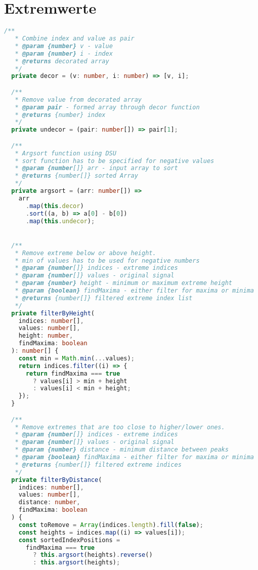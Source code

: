 \section{Extremwerte}\label{appendix:trend-detection-code:peaks}
\begin{lstlisting}[language=Typescript]
  /**
   * Combine index and value as pair
   * @param {number} v - value
   * @param {number} i - index
   * @returns decorated array
   */
  private decor = (v: number, i: number) => [v, i];

  /**
   * Remove value from decorated array
   * @param pair - formed array through decor function
   * @returns {number} index
   */
  private undecor = (pair: number[]) => pair[1];

  /**
   * Argsort function using DSU
   * sort function has to be specified for negative values
   * @param {number[]} arr - input array to sort
   * @returns {number[]} sorted Array
   */
  private argsort = (arr: number[]) =>
    arr
      .map(this.decor)
      .sort((a, b) => a[0] - b[0])
      .map(this.undecor);


  /**
   * Remove extreme below or above height.
   * min of values has to be used for negative numbers
   * @param {number[]} indices - extreme indices
   * @param {number[]} values - original signal
   * @param {number} height - minimum or maximum extreme height
   * @param {boolean} findMaxima - either filter for maxima or minima
   * @returns {number[]} filtered extreme index list
   */
  private filterByHeight(
    indices: number[],
    values: number[],
    height: number,
    findMaxima: boolean
  ): number[] {
    const min = Math.min(...values);
    return indices.filter((i) => {
      return findMaxima === true
        ? values[i] > min + height
        : values[i] < min + height;
    });
  }

  /**
   * Remove extremes that are too close to higher/lower ones.
   * @param {number[]} indices - extreme indices
   * @param {number[]} values - original signal
   * @param {number} distance - minimum distance between peaks
   * @param {boolean} findMaxima - either filter for maxima or minima
   * @returns {number[]} filtered extreme indices
   */
  private filterByDistance(
    indices: number[],
    values: number[],
    distance: number,
    findMaxima: boolean
  ) {
    const toRemove = Array(indices.length).fill(false);
    const heights = indices.map((i) => values[i]);
    const sortedIndexPositions =
      findMaxima === true
        ? this.argsort(heights).reverse()
        : this.argsort(heights);


\end{lstlisting}
